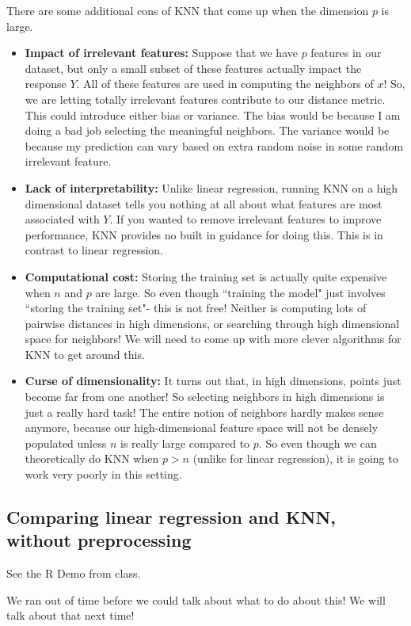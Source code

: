 There are some additional cons of KNN that come up when the dimension $p$ is large. 
\begin{itemize}
\item \textbf{Impact of irrelevant features:} Suppose that we have $p$ features in our dataset, but only a small subset of these features actually impact the response $Y$. All of these features are used in computing the neighbors of $x$! So, we are letting totally irrelevant features contribute to our distance metric. This could introduce either bias or variance. The bias would be because I am doing a bad job selecting the meaningful neighbors. The variance would be because my prediction can vary based on extra random noise in some random irrelevant feature. 
\item \textbf{Lack of interpretability:} Unlike linear regression, running KNN on a high dimensional dataset tells you nothing at all about what features are most associated with $Y$. If you wanted to remove irrelevant features to improve performance, KNN provides no built in guidance for doing this. This is in contrast to linear regression. 
\item \textbf{Computational cost:} Storing the training set is actually quite expensive when $n$ and $p$ are large. So even though ``training the model" just involves ``storing the training set"- this is not free! Neither is computing lots of pairwise distances in high dimensions, or searching through high dimensional space for neighbors! We will need to come up with more clever algorithms for KNN to get around this. 
\item \textbf{Curse of dimensionality:} It turns out that, in high dimensions, points just become far from one another! So selecting neighbors in high dimensions is just a really hard task! The entire notion of neighbors hardly makes sense anymore, because our high-dimensional feature space will not be densely populated unless $n$ is really large compared to $p$.  So even though we can theoretically do KNN when $p > n$ (unlike for linear regression), it is going to work very poorly in this setting. 
\end{itemize}


\subsection{Comparing linear regression and KNN, without preprocessing}

See the R Demo from class.

We ran out of time before we could talk about what to do about this! We will talk about that next time!



